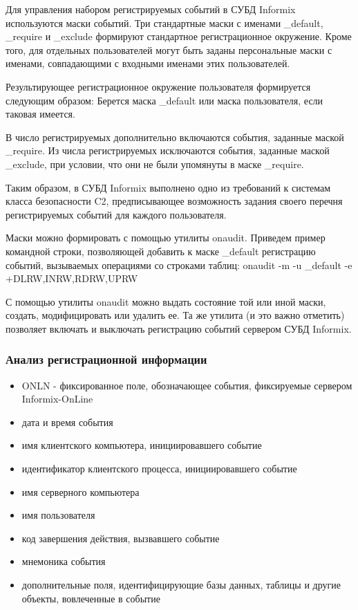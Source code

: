 Для управления набором регистрируемых событий в СУБД Informix используются маски событий. Три стандартные маски с именами \_default, \_require и \_exclude формируют стандартное регистрационное окружение. Кроме того, для отдельных пользователей могут быть заданы персональные маски с именами, совпадающими с входными именами этих пользователей.

Результирующее регистрационное окружение пользователя формируется следующим образом:
Берется маска \_default или маска пользователя, если таковая имеется.

В число регистрируемых дополнительно включаются события, заданные маской \_require.
Из числа регистрируемых исключаются события, заданные маской \_exclude, при условии, что они не были упомянуты в маске \_require.

Таким образом, в СУБД Informix выполнено одно из требований к системам класса безопасности C2, предписывающее возможность задания своего перечня регистрируемых событий для каждого пользователя.

Маски можно формировать с помощью утилиты onaudit. Приведем пример командной строки, позволяющей добавить к маске \_default регистрацию событий, вызываемых операциями со строками таблиц:
onaudit -m -u \_default -e +DLRW,INRW,RDRW,UPRW

С помощью утилиты onaudit можно выдать состояние той или иной маски, создать, модифицировать или удалить ее. Та же утилита (и это важно отметить) позволяет включать и выключать регистрацию событий сервером СУБД Informix.

\subsubsection{Анализ регистрационной информации}
\begin{itemize}
    \item ONLN - фиксированное поле, обозначающее события, фиксируемые сервером Informix-OnLine
    \item дата и время события
    \item имя клиентского компьютера, инициировавшего событие
    \item идентификатор клиентского процесса, инициировавшего событие
    \item имя серверного компьютера
    \item имя пользователя
    \item код завершения действия, вызвавшего событие
    \item мнемоника события
    \item дополнительные поля, идентифицирующие базы данных, таблицы и другие объекты, вовлеченные в событие
\end{itemize}

